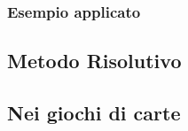 \subsubsection*{Esempio applicato}


\subsection{Metodo Risolutivo}



\subsection{Nei giochi di carte}



